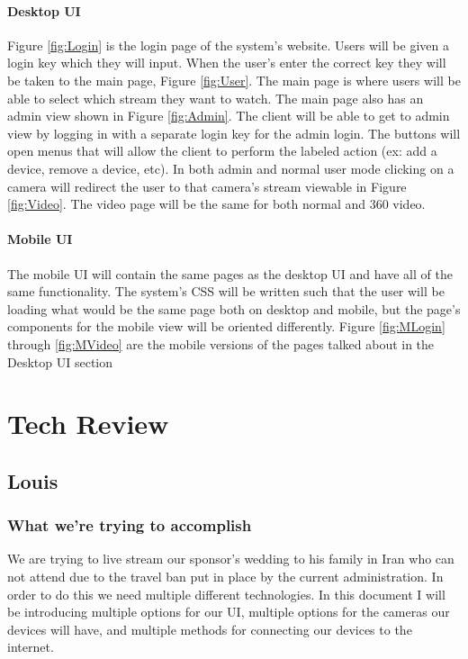 \documentclass[onecolumn, draftclsnofoot,10pt, compsoc]{IEEEtran}
\begin{document}
        \paragraph{Desktop UI}
        Figure \ref{fig:Login} is the login page of the system's website. Users will be given a login key which they will input. When the user's enter the correct key they will be taken to the main page, Figure \ref{fig:User}. The main page is where users will be able to select which stream they want to watch. The main page also has an admin view shown in Figure \ref{fig:Admin}. The client will be able to get to admin view by logging in with a separate login key for the admin login. The buttons will open menus that will allow the client to perform the labeled action (ex: add a device, remove a device, etc). In both admin and normal user mode clicking on a camera will redirect the user to that camera's stream viewable in Figure \ref{fig:Video}. The video page will be the same for both normal and 360 video.

        \paragraph{Mobile UI}
        The mobile UI will contain the same pages as the desktop UI and have all of the same functionality. The system's CSS will be written such that the user will be loading what would be the same page both on desktop and mobile, but the page's components for the mobile view will be oriented differently. Figure \ref{fig:MLogin} through \ref{fig:MVideo} are the mobile versions of the pages talked about in the Desktop UI section
\newpage
\section{Tech Review}

    \subsection{Louis}
    
        \subsubsection{What we're trying to accomplish}
        We are trying to live stream our sponsor's wedding to his family in Iran who can not attend due to the travel ban put in place by the current administration. In order to do this we need multiple different technologies. In this document I will be introducing multiple options for our UI, multiple options for the cameras our devices will have, and multiple methods for connecting our devices to the internet.
        
\end{document}
